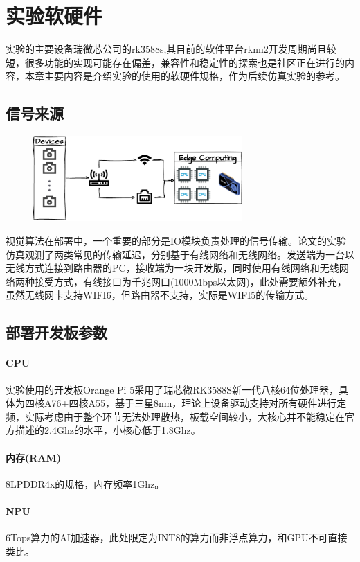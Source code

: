 \documentclass[master]{shtthesis}
\begin{document}
\section{实验软硬件}
实验的主要设备瑞微芯公司的rk3588s,其目前的软件平台rknn2开发周期尚且较短，很多功能的实现可能存在偏差，兼容性和稳定性的探索也是社区正在进行的内容，本章主要内容是介绍实验的使用的软硬件规格，作为后续仿真实验的参考。

\subsection{信号来源}
\begin{figure}[htbp]
	\centering
	\includegraphics[width=8cm]{img/sim.pdf}
	\label{实验仿真的传输场景}
\end{figure}
视觉算法在部署中，一个重要的部分是IO模块负责处理的信号传输。论文的实验仿真观测了两类常见的传输延迟，分别基于有线网络和无线网络。发送端为一台以无线方式连接到路由器的PC，接收端为一块开发版，同时使用有线网络和无线网络两种接受方式，有线接口为千兆网口(1000Mbps以太网)，此处需要额外补充，虽然无线网卡支持WIFI6，但路由器不支持，实际是WIFI5的传输方式。

\subsection{部署开发板参数}

\paragraph{CPU}实验使用的开发板Orange Pi 5采用了瑞芯微RK3588S新一代八核64位处理器，具体为四核A76+四核A55，基于三星8nm，理论上设备驱动支持对所有硬件进行定频，实际考虑由于整个环节无法处理散热，板载空间较小，大核心并不能稳定在官方描述的2.4Ghz的水平，小核心低于1.8Ghz。

\paragraph{内存(RAM)}8LPDDR4x的规格，内存频率1Ghz。

\paragraph{NPU}6Tops算力的AI加速器，此处限定为INT8的算力而非浮点算力，和GPU不可直接类比。
\end{document}
